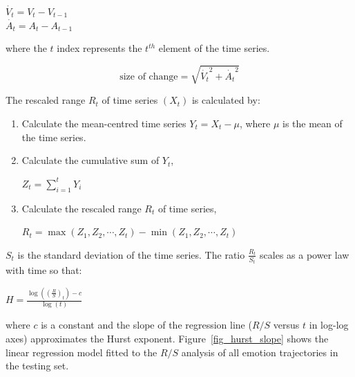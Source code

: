 \documentclass[10pt,journal,cspaper,compsoc]{IEEEtran}
\begin{document}
\begin{center}
$\dot{V_{t}}= V_{t}-V_{t-1} $  \\
$\dot{A_{t}}= A_{t}-A_{t-1} $ \\
\end{center}

\noindent where the $t$ index represents the $t^{th}$ element of the time series.

\begin{equation}
\label{eq_size_of_change}
\text{size of change}=\sqrt{\dot{V_{t}}^{2}+\dot{A_{t}}^{2}}
\end{equation}

\noindent The rescaled range $R_{t}$ of time series $(X_{t})$ is calculated by:

\begin{enumerate}
\item Calculate the mean-centred time series $Y_{t}=X_{t}-\mu$, where $\mu$ is the mean of the time series.
\item Calculate the cumulative sum of $Y_{t}$,
\begin{center}
$Z_{t}=\sum \limits_{i=1}^t Y_{i}$
\end{center}
\item Calculate the rescaled range $R_{t}$ of time series,
\begin{center}
$R_{t}=\max(Z_{1}, Z_{2}, \cdots, Z_{t}) - \min(Z_{1}, Z_{2}, \cdots, Z_{t})$
\end{center}
\end{enumerate}

\noindent $S_{t}$ is the standard deviation of the time series. The ratio $\frac{R_{t}}{S_{t}}$ scales as a power law with time so that:
\begin{center}
$H=\frac{\log \left( \left( \frac{R}{S} \right) _{t} \right) - c}{\log(t)}$
\end{center}
\noindent where $c$ is a constant and the slope of the regression line ($R/S$ versus $t$ in log-log axes) approximates the Hurst exponent. Figure~\ref{fig_hurst_slope} shows the linear regression model fitted to the $R/S$ analysis of all emotion trajectories in the testing set.
\end{document}
